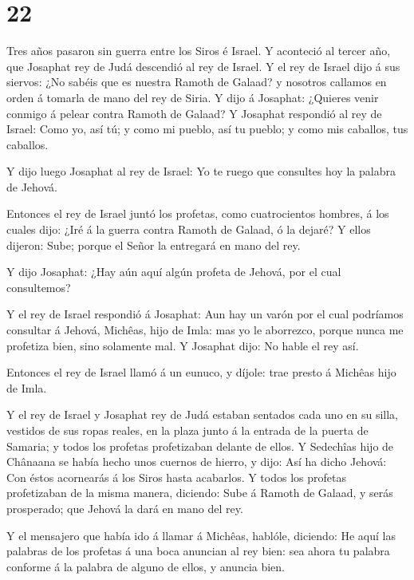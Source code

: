 \hypertarget{section-21}{%
\section{22}\label{section-21}}

 Tres años pasaron sin guerra entre los Siros é Israel.
 Y aconteció al tercer año, que Josaphat rey de Judá
descendió al rey de Israel.  Y el rey de Israel dijo á sus
siervos: ¿No sabéis que es nuestra Ramoth de Galaad? y nosotros callamos
en orden á tomarla de mano del rey de Siria.  Y dijo á
Josaphat: ¿Quieres venir conmigo á pelear contra Ramoth de Galaad? Y
Josaphat respondió al rey de Israel: Como yo, así tú; y como mi pueblo,
así tu pueblo; y como mis caballos, tus caballos.

 Y dijo luego Josaphat al rey de Israel: Yo te ruego que
consultes hoy la palabra de Jehová.

 Entonces el rey de Israel juntó los profetas, como
cuatrocientos hombres, á los cuales dijo: ¿Iré á la guerra contra Ramoth
de Galaad, ó la dejaré? Y ellos dijeron: Sube; porque el Señor la
entregará en mano del rey.

 Y dijo Josaphat: ¿Hay aún aquí algún profeta de Jehová, por
el cual consultemos?

 Y el rey de Israel respondió á Josaphat: Aun hay un varón
por el cual podríamos consultar á Jehová, Michêas, hijo de Imla: mas yo
le aborrezco, porque nunca me profetiza bien, sino solamente mal. Y
Josaphat dijo: No hable el rey así.

 Entonces el rey de Israel llamó á un eunuco, y díjole: trae
presto á Michêas hijo de Imla.

 Y el rey de Israel y Josaphat rey de Judá estaban sentados
cada uno en su silla, vestidos de sus ropas reales, en la plaza junto á
la entrada de la puerta de Samaria; y todos los profetas profetizaban
delante de ellos.  Y Sedechîas hijo de Chânaana se había
hecho unos cuernos de hierro, y dijo: Así ha dicho Jehová: Con éstos
acornearás á los Siros hasta acabarlos.  Y todos los
profetas profetizaban de la misma manera, diciendo: Sube á Ramoth de
Galaad, y serás prosperado; que Jehová la dará en mano del rey.

 Y el mensajero que había ido á llamar á Michêas, hablóle,
diciendo: He aquí las palabras de los profetas á una boca anuncian al
rey bien: sea ahora tu palabra conforme á la palabra de alguno de ellos,
y anuncia bien.

